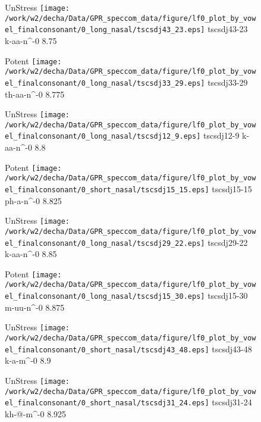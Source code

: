 \documentclass{article}
\begin{document}
\begin{figure}[t]
\begin{minipage}[b]{.24\textwidth}
UnStress
\centering
\texttt{[image: /work/w2/decha/Data/GPR\_speccom\_data/figure/lf0\_plot\_by\_vowel\_finalconsonant/0\_long\_nasal/tscsdj43\_23.eps]}
tscsdj43-23 k-aa-n\textasciicircum-0 8.75
\end{minipage}
\begin{minipage}[b]{.24\textwidth}
\colorbox{Apricot}{Potent}
\centering
\texttt{[image: /work/w2/decha/Data/GPR\_speccom\_data/figure/lf0\_plot\_by\_vowel\_finalconsonant/0\_long\_nasal/tscsdj33\_29.eps]}
tscsdj33-29 th-aa-n\textasciicircum-0 8.775
\end{minipage}
\begin{minipage}[b]{.24\textwidth}
UnStress
\centering
\texttt{[image: /work/w2/decha/Data/GPR\_speccom\_data/figure/lf0\_plot\_by\_vowel\_finalconsonant/0\_long\_nasal/tscsdj12\_9.eps]}
tscsdj12-9 k-aa-n\textasciicircum-0 8.8
\end{minipage}
\begin{minipage}[b]{.24\textwidth}
\colorbox{Apricot}{Potent}
\centering
\texttt{[image: /work/w2/decha/Data/GPR\_speccom\_data/figure/lf0\_plot\_by\_vowel\_finalconsonant/0\_short\_nasal/tscsdj15\_15.eps]}
tscsdj15-15 ph-a-n\textasciicircum-0 8.825
\end{minipage}
\end{figure}
\clearpage
\begin{figure}[t]
\begin{minipage}[b]{.24\textwidth}
UnStress
\centering
\texttt{[image: /work/w2/decha/Data/GPR\_speccom\_data/figure/lf0\_plot\_by\_vowel\_finalconsonant/0\_long\_nasal/tscsdj29\_22.eps]}
tscsdj29-22 k-aa-n\textasciicircum-0 8.85
\end{minipage}
\begin{minipage}[b]{.24\textwidth}
\colorbox{Apricot}{Potent}
\centering
\texttt{[image: /work/w2/decha/Data/GPR\_speccom\_data/figure/lf0\_plot\_by\_vowel\_finalconsonant/0\_long\_nasal/tscsdj15\_30.eps]}
tscsdj15-30 m-uu-n\textasciicircum-0 8.875
\end{minipage}
\begin{minipage}[b]{.24\textwidth}
UnStress
\centering
\texttt{[image: /work/w2/decha/Data/GPR\_speccom\_data/figure/lf0\_plot\_by\_vowel\_finalconsonant/0\_short\_nasal/tscsdj43\_48.eps]}
tscsdj43-48 k-a-m\textasciicircum-0 8.9
\end{minipage}
\begin{minipage}[b]{.24\textwidth}
UnStress
\centering
\texttt{[image: /work/w2/decha/Data/GPR\_speccom\_data/figure/lf0\_plot\_by\_vowel\_finalconsonant/0\_short\_nasal/tscsdj31\_24.eps]}
tscsdj31-24 kh-@-m\textasciicircum-0 8.925
\end{minipage}
\end{figure}
\end{document}
